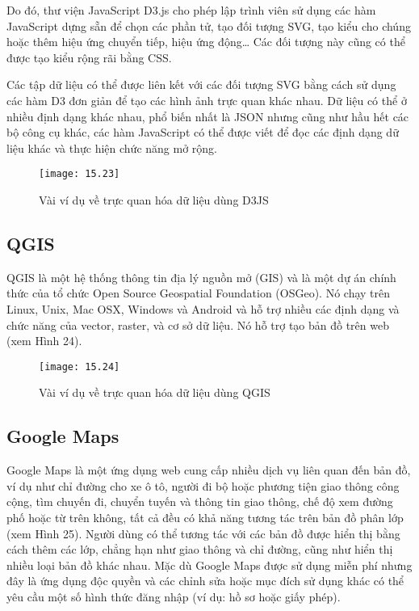 \documentclass[13pt]{scrartcl} %
\begin{document}
Do đó, thư viện JavaScript D3.js cho phép lập trình viên sử dụng các hàm JavaScript dựng sẵn để chọn các phần tử, tạo đối tượng SVG, tạo kiểu cho chúng hoặc thêm hiệu ứng chuyển tiếp, hiệu ứng động… Các đối tượng này cũng có thể được tạo kiểu rộng rãi bằng CSS.

Các tập dữ liệu có thể được liên kết với các đối tượng SVG bằng cách sử dụng các hàm D3 đơn giản để tạo các hình ảnh trực quan khác nhau. Dữ liệu có thể ở nhiều định dạng khác nhau, phổ biến nhất là JSON nhưng cũng như hầu hết các bộ công cụ khác, các hàm JavaScript có thể được viết để đọc các định dạng dữ liệu khác và thực hiện chức năng mở rộng.

\begin{figure}[!ht]
    \centering
    \texttt{[image: 15.23]}
    \caption{Vài ví dụ về trực quan hóa dữ liệu dùng D3JS}
\end{figure}

\subsection{QGIS}
QGIS là một hệ thống thông tin địa lý nguồn mở (GIS) và là một dự án chính thức của tổ chức Open Source Geospatial Foundation (OSGeo). Nó chạy trên Linux, Unix, Mac OSX, Windows và Android và hỗ trợ nhiều các định dạng và chức năng của vector, raster, và cơ sở dữ liệu. Nó hỗ trợ tạo bản đồ trên web (xem Hình 24).

\begin{figure}[!ht]
    \centering
    \texttt{[image: 15.24]}
    \caption{Vài ví dụ về trực quan hóa dữ liệu dùng QGIS}
\end{figure}

\subsection{Google Maps}
Google Maps là một ứng dụng web cung cấp nhiều dịch vụ liên quan đến bản đồ, ví dụ như chỉ đường cho xe ô tô, người đi bộ hoặc phương tiện giao thông công cộng, tìm chuyến đi, chuyển tuyến và thông tin giao thông, chế độ xem đường phố hoặc từ trên không, tất cả đều có khả năng tương tác trên bản đồ phân lớp (xem Hình 25). Người dùng có thể tương tác với các bản đồ được hiển thị bằng cách thêm các lớp, chẳng hạn như giao thông và chỉ đường, cũng như hiển thị nhiều loại bản đồ khác nhau. Mặc dù Google Maps được sử dụng miễn phí nhưng đây là ứng dụng độc quyền và các chỉnh sửa hoặc mục đích sử dụng khác có thể yêu cầu một số hình thức đăng nhập (ví dụ: hồ sơ hoặc giấy phép).
\end{document}
